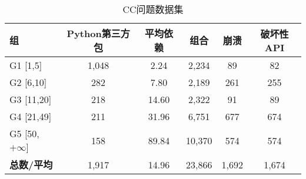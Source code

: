 \begin{table}[t]
	\centering
	\begin{threeparttable}
		\caption{CC问题数据集}
		\label{tab:CC}
		\begin{tabularx}{0.95\textwidth}{Xccccc}
			\toprule
			\textbf{组}&\textbf{Python第三方包}&\textbf{平均依赖}&\textbf{组合}&\textbf{崩溃}&\textbf{破坏性API} \\
			\midrule
			G1 [1,5]&1,048&2.24&2,234&89&82\\
			G2 [6,10]&282&7.80&2,189&261&255\\
			G3 [11,20]&218&14.60&2,322&91&89\\
			G4 [21,49]&211&31.96&6,751&677&674\\
			G5 [50,$+\infty$]&158&89.84&10,370&574&574\\
			\midrule
			\textbf{总数/平均} &1,917&14.96&23,866&1,692&1,674\\
			\bottomrule
		\end{tabularx}
	\end{threeparttable}
\end{table}